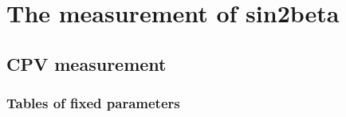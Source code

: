 
\chapter{The measurement of sin2beta}
\label{ch:app:measurement_of_sin2beta}

\section{CPV measurement}
\label{sec:app:measurement_of_sin2beta:cpv_measurement}

\subsection{Tables of fixed parameters}
\label{sec:app:measurement_of_sin2beta:cpv_measurement:fixed_parameters}

